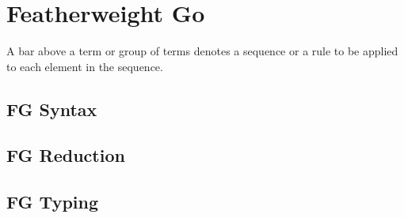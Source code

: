 \section{Featherweight Go}

A bar above a term or group of terms denotes a sequence or a rule to be applied
to each element in the sequence.

\subsection{FG Syntax}



\subsection{FG Reduction}



\subsection{FG Typing}



